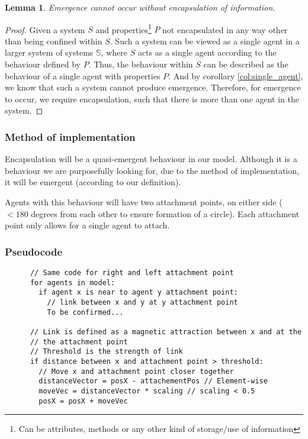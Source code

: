 \documentclass{article}
\newtheorem{lemma}[theorem]{Lemma}
\begin{document}
      \begin{lemma}
        Emergence cannot occur without encapsulation of information.
      \end{lemma}
      \begin{proof}
        
        Given a system $S$ and properties\footnote{Can be attributes, methods or  any other kind of storage/use of information} $P$ not encapsulated in any way other than being confined within $S$. Such a system can be viewed as a single agent in a larger system of systems $\mathbb{S}$, where $S$ acts as a single agent according to the behaviour defined by $P$. Thus, the behaviour within $S$ can be described as the behaviour of a single agent with properties $P$. And by corollary \ref{col:single_agent}, we know that such a system cannot produce emergence. Therefore, for emergence to occur, we require encapsulation, such that there is more than one agent in the system. 

      \end{proof}

    \subsubsection{Method of implementation}
      
      Encapsulation will be a quasi-emergent behaviour in our model. Although it is a behaviour we are purposefully looking for, due to the method of implementation, it will be emergent (according to our definition).

      Agents with this behaviour will have two attachment points, on either side ($<180$ degrees from each other to ensure formation of a circle). Each attachment point only allows for a single agent to attach.

    \subsubsection{Pseudocode}

      \begin{verbatim}
      // Same code for right and left attachment point
      for agents in model:
        if agent x is near to agent y attachment point:
          // link between x and y at y attachment point
          To be confirmed... 

      // Link is defined as a magnetic attraction between x and at the
      // the attachment point
      // Threshold is the strength of link
      if distance between x and attachment point > threshold:
        // Move x and attachment point closer together
        distanceVector = posX - attachementPos // Element-wise 
        moveVec = distanceVector * scaling // scaling < 0.5
        posX = posX + moveVec
      \end{verbatim}
\end{document}
